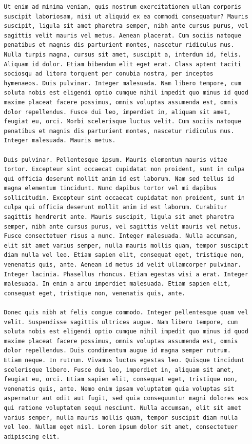 \documentclass[a4paper, 12pt]{article}
\begin{document}
\begin{verbatim}
Ut enim ad minima veniam, quis nostrum exercitationem ullam corporis suscipit laboriosam, nisi ut aliquid ex ea commodi consequatur? Mauris suscipit, ligula sit amet pharetra semper, nibh ante cursus purus, vel sagittis velit mauris vel metus. Aenean placerat. Cum sociis natoque penatibus et magnis dis parturient montes, nascetur ridiculus mus. Nulla turpis magna, cursus sit amet, suscipit a, interdum id, felis. Aliquam id dolor. Etiam bibendum elit eget erat. Class aptent taciti sociosqu ad litora torquent per conubia nostra, per inceptos hymenaeos. Duis pulvinar. Integer malesuada. Nam libero tempore, cum soluta nobis est eligendi optio cumque nihil impedit quo minus id quod maxime placeat facere possimus, omnis voluptas assumenda est, omnis dolor repellendus. Fusce dui leo, imperdiet in, aliquam sit amet, feugiat eu, orci. Morbi scelerisque luctus velit. Cum sociis natoque penatibus et magnis dis parturient montes, nascetur ridiculus mus. Integer malesuada. Mauris metus.

Duis pulvinar. Pellentesque ipsum. Mauris elementum mauris vitae tortor. Excepteur sint occaecat cupidatat non proident, sunt in culpa qui officia deserunt mollit anim id est laborum. Nam sed tellus id magna elementum tincidunt. Nunc dapibus tortor vel mi dapibus sollicitudin. Excepteur sint occaecat cupidatat non proident, sunt in culpa qui officia deserunt mollit anim id est laborum. Curabitur sagittis hendrerit ante. Mauris suscipit, ligula sit amet pharetra semper, nibh ante cursus purus, vel sagittis velit mauris vel metus. Fusce consectetuer risus a nunc. Integer malesuada. Nulla accumsan, elit sit amet varius semper, nulla mauris mollis quam, tempor suscipit diam nulla vel leo. Etiam sapien elit, consequat eget, tristique non, venenatis quis, ante. Aenean id metus id velit ullamcorper pulvinar. Integer lacinia. Phasellus rhoncus. Etiam egestas wisi a erat. Integer malesuada. In enim a arcu imperdiet malesuada. Etiam sapien elit, consequat eget, tristique non, venenatis quis, ante.

Donec quis nibh at felis congue commodo. Integer pellentesque quam vel velit. Suspendisse sagittis ultrices augue. Nam libero tempore, cum soluta nobis est eligendi optio cumque nihil impedit quo minus id quod maxime placeat facere possimus, omnis voluptas assumenda est, omnis dolor repellendus. Duis condimentum augue id magna semper rutrum. Etiam neque. In rutrum. Vivamus luctus egestas leo. Quisque tincidunt scelerisque libero. Fusce dui leo, imperdiet in, aliquam sit amet, feugiat eu, orci. Etiam sapien elit, consequat eget, tristique non, venenatis quis, ante. Nemo enim ipsam voluptatem quia voluptas sit aspernatur aut odit aut fugit, sed quia consequuntur magni dolores eos qui ratione voluptatem sequi nesciunt. Nulla accumsan, elit sit amet varius semper, nulla mauris mollis quam, tempor suscipit diam nulla vel leo. Nullam eget nisl. Lorem ipsum dolor sit amet, consectetuer adipiscing elit.


\end{verbatim}
\end{document}
